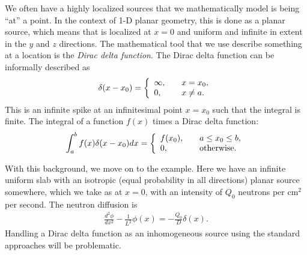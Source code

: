 We often have a highly localized sources that we mathematically model is being ``at'' a point. In the context of 1-D planar geometry, this is done as a planar source, which means that is localized at $x = 0$ and uniform and infinite in extent in the $y$ and $z$ directions. The mathematical tool that we use describe something at a location is the \emph{Dirac delta function}. The Dirac delta function can be informally described as
\begin{align}
  \delta( x - x_0 ) = \left\{ \begin{array}{l l}
  \infty, & \quad x = x_0, \\
  0, & \quad x \ne a. \end{array} \right.
\end{align}
This is an infinite spike at an infinitesimal point $x = x_0$ such that the integral is finite. The integral of a function $f(x)$ times a Dirac delta function:
\begin{align} \label{Eq:neutronics_integralDiracDelta}
  \int_a^b f(x) \delta( x - x_0 ) dx = \left\{ \begin{array}{l l}
  f(x_0), 	& \quad a \le x_0 \le b, \\
  0,		& \quad \text{otherwise.} \end{array} \right. 
\end{align}

With this background, we move on to the example. Here we have an infinite uniform slab with an isotropic (equal probability in all directions) planar source somewhere, which we take as at $x = 0$, with an intensity of $Q_0$ neutrons per cm$^2$ per second. The neutron diffusion is
\begin{align}
  \frac{d^2 \phi}{dx^2} - \frac{1}{L^2} \phi(x) = -\frac{Q_0}{D} \delta( x ) .
\end{align}
Handling a Dirac delta function as an inhomogeneous source using the standard approaches will be problematic. 

